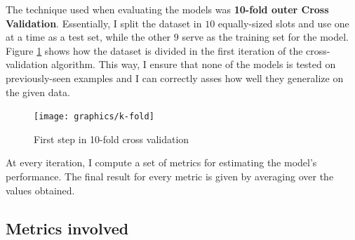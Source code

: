 		The technique used when evaluating the models was \textbf{10-fold outer Cross Validation}. Essentially, I split the dataset in $10$ equally-sized slots and use one at a time as a test set, while the other $9$ serve as the training set for the model. Figure \ref{Fig: impl/ml/methodology/kfold/first} shows how the dataset is divided in the first iteration of the cross-validation algorithm. This way, I ensure that none of the models is tested on previously-seen examples and I can correctly asses how well they generalize on the given data.
		\begin{figure}[H]
			\centering
			\texttt{[image: graphics/k-fold]}
			\caption{First step in 10-fold cross validation}
			\label{Fig: impl/ml/methodology/kfold/first}
		\end{figure}
		
		At every iteration, I compute a set of metrics for estimating the model's performance. The final result for every metric is given by averaging over the values obtained. 
	\subsection{Metrics involved} \label{Section: eval/ml/metrics}
	
